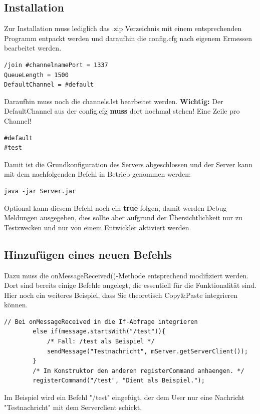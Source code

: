 \documentclass[a4paper,12pt]{scrartcl}
\begin{document}
\subsection{Installation}
Zur Installation muss lediglich das .zip Verzeichnis mit einem entsprechenden Programm entpackt werden und daraufhin die config.cfg nach eigenem Ermessen bearbeitet werden.
\begin{lstlisting}[frame=single,caption=Beispielinhalt der Konfigurationsdatei]
/join #channelnamePort = 1337
QueueLength = 1500
DefaultChannel = #default
\end{lstlisting}
Daraufhin muss noch die channels.lst bearbeitet werden. \textbf{Wichtig:} Der DefaultChannel aus der config.cfg \textbf{muss} dort nochmal stehen! Eine Zeile pro Channel!
\begin{lstlisting}[frame=single,caption=Beispielinhalt der Channeldatei]
#default
#test
\end{lstlisting}

Damit ist die Grundkonfiguration des Servers abgeschlossen und der Server kann mit dem nachfolgenden Befehl in Betrieb genommen werden:
\begin{lstlisting}[frame=single,caption=Startbefehl]
java -jar Server.jar
\end{lstlisting}
Optional kann diesem Befehl noch ein \textbf{true} folgen, damit werden Debug Meldungen ausgegeben, dies sollte aber aufgrund der Übersichtlichkeit nur zu Testzwecken und nur von einem Entwickler aktiviert werden.

\subsection{Hinzufügen eines neuen Befehls}
Dazu muss die onMessageReceived()-Methode entsprechend modifiziert werden. Dort sind bereits einige Befehle angelegt, die essentiell für die Funktionalität sind.\\

Hier noch ein weiteres Beispiel, dass Sie theoretisch Copy\&Paste integrieren können.
\begin{lstlisting}[frame=single,caption=Beispielinhalt der Channeldatei]
		// Bei onMessageReceived in die If-Abfrage integrieren
 		else if(message.startsWith("/test")){
			/* Fall: /test als Beispiel */
			sendMessage("Testnachricht", mServer.getServerClient());			
		}
		/* Im Konstruktor den anderen registerCommand anhaengen. */
		registerCommand("/test", "Dient als Beispiel."); 
\end{lstlisting}
Im Beispiel wird ein Befehl "/test" {eingefügt}, der dem User nur eine Nachricht "Testnachricht" mit dem Serverclient schickt.
\clearpage
\end{document}
